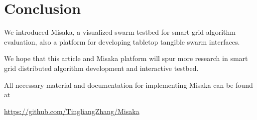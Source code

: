 \documentclass[conference]{IEEEtran}
\begin{document}
\section{Conclusion}

We introduced Misaka, a visualized swarm testbed for smart grid algorithm evaluation, also a platform for developing tabletop tangible swarm interfaces.

We hope that this article and Misaka platform will spur more research in smart grid distributed algorithm development and interactive testbed.

All necessary material and documentation for implementing Misaka can be found at

\href{https://github.com/TingliangZhang/Misaka}{https://github.com/TingliangZhang/Misaka}



\end{document}
